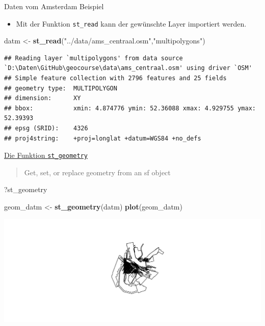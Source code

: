 \documentclass[ignorenonframetext,]{beamer}
\newenvironment{Shaded}{\begin{snugshade}}{\end{snugshade}}
\newcommand{\KeywordTok}[1]{\textcolor[rgb]{0.13,0.29,0.53}{\textbf{#1}}}
\newcommand{\StringTok}[1]{\textcolor[rgb]{0.31,0.60,0.02}{#1}}
\newcommand{\NormalTok}[1]{#1}
\providecommand{\tightlist}{%
  \setlength{\itemsep}{0pt}\setlength{\parskip}{0pt}}
\begin{document}
\begin{frame}[fragile]{Daten vom Amsterdam Beispiel}

\begin{itemize}
\tightlist
\item
  Mit der Funktion \texttt{st\_read} kann der gewünschte Layer
  importiert werden.
\end{itemize}

\begin{Shaded}
\begin{Highlighting}[]
\NormalTok{datm <-}\StringTok{ }\KeywordTok{st_read}\NormalTok{(}\StringTok{"../data/ams_centraal.osm"}\NormalTok{,}\StringTok{"multipolygons"}\NormalTok{)}
\end{Highlighting}
\end{Shaded}

\begin{verbatim}
## Reading layer `multipolygons' from data source `D:\Daten\GitHub\geocourse\data\ams_centraal.osm' using driver `OSM'
## Simple feature collection with 2796 features and 25 fields
## geometry type:  MULTIPOLYGON
## dimension:      XY
## bbox:           xmin: 4.874776 ymin: 52.36088 xmax: 4.929755 ymax: 52.39393
## epsg (SRID):    4326
## proj4string:    +proj=longlat +datum=WGS84 +no_defs
\end{verbatim}

\end{frame}

\begin{frame}[fragile]{\href{https://cran.r-project.org/web/packages/sf/vignettes/sf3.html}{Die
Funktion \texttt{st\_geometry}}}

\begin{quote}
Get, set, or replace geometry from an sf object
\end{quote}

\begin{Shaded}
\begin{Highlighting}[]
\NormalTok{?st_geometry}
\end{Highlighting}
\end{Shaded}

\begin{Shaded}
\begin{Highlighting}[]
\NormalTok{geom_datm <-}\StringTok{ }\KeywordTok{st_geometry}\NormalTok{(datm)}
\KeywordTok{plot}\NormalTok{(geom_datm)}
\end{Highlighting}
\end{Shaded}

\includegraphics{simplefeatures_files/figure-beamer/unnamed-chunk-20-1.pdf}

\end{frame}
\end{document}

